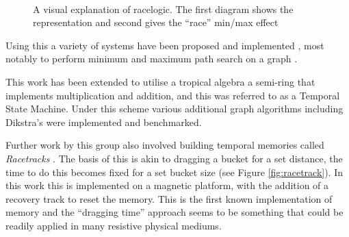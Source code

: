 \documentclass{article}
\begin{document}
\begin{figure}[ht]
	\centering
	\\
	\caption{A visual explanation of racelogic. The first diagram shows the representation and second gives the ``race'' min/max effect}
	\label{fig:race}
\end{figure}


Using this a variety of systems have been proposed and implemented \cite{madhavan2014race}, most notably to perform minimum and maximum path search on a graph \cite{madhavan2015race}.

This work has been extended to utilise a tropical algebra \cite{madhavan2021temporal} a semi-ring that implements multiplication and addition, and this was referred to as a Temporal State Machine. Under this scheme various additional graph algorithms including Dikstra's were implemented and benchmarked.

Further work by this group also involved building temporal memories called \textit{Racetracks} \cite{vakili2020temporal,madhavan2020storing}. The basis of this is akin to dragging a bucket for a set distance, the time to do this becomes fixed for a set bucket size (see Figure \ref{fig:racetrack}). In this work this is implemented on a magnetic platform, with the addition of a recovery track to reset the memory. This is the first known implementation of memory and the ``dragging time'' approach seems to be something that could be readily applied in many resistive physical mediums.
\end{document}
